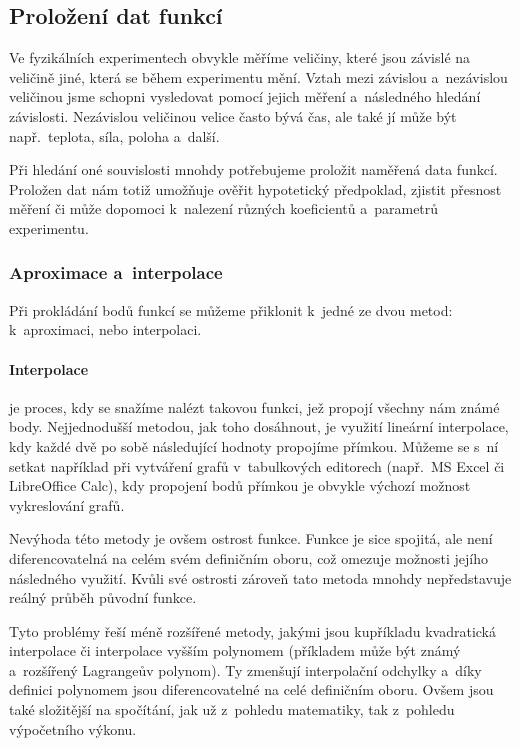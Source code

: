 \newcommand{\nsum}{\sum^n_{i=1}}
\newcommand{\nsumx}{\sum^n_{i=1}x_i}
\newcommand{\nsumy}{\sum^n_{i=1}y_i}
\newcommand{\nsumxx}{\sum^n_{i=1}x_i^2}
\newcommand{\nsumxy}{\sum^n_{i=1}x_iy_i}

\subsection{Proložení dat funkcí}
Ve fyzikálních experimentech obvykle měříme veličiny, které jsou závislé na
veličině jiné, která se během experimentu mění. Vztah mezi závislou
a~nezávislou veličinou jsme schopni vysledovat pomocí jejich měření a~následného
hledání závislosti.  Nezávislou veličinou velice často bývá čas, ale také jí
může být např.~teplota, síla, poloha a~další.~\cite{praktikum}
 
Při hledání oné souvislosti mnohdy potřebujeme proložit naměřená data funkcí.
Proložen dat nám totiž umožňuje ověřit hypotetický předpoklad, zjistit přesnost
měření či může dopomoci k~nalezení různých koeficientů a~parametrů experimentu.

\subsubsection{Aproximace a~interpolace}
Při prokládání bodů funkcí se můžeme přiklonit k~jedné ze dvou metod:
k~aproximaci, nebo interpolaci.

\paragraph{Interpolace} je proces, kdy se snažíme nalézt takovou funkci, jež
propojí všechny nám známé body. Nejjednodušší metodou, jak toho dosáhnout, je
využití lineární interpolace, kdy každé dvě po sobě následující hodnoty
propojíme přímkou. Můžeme se s~ní setkat například při vytváření grafů
v~tabulkových editorech (např.~MS Excel či LibreOffice Calc), kdy propojení
bodů přímkou je obvykle výchozí možnost vykreslování grafů. 

Nevýhoda této metody je ovšem ostrost funkce. Funkce je sice spojitá, ale není
diferencovatelná na celém svém definičním oboru, což omezuje možnosti jejího
následného využití. Kvůli své ostrosti zároveň tato metoda mnohdy nepředstavuje
reálný průběh původní funkce.~\cite{segeth}

Tyto problémy řeší méně rozšířené metody, jakými jsou kupříkladu kvadratická
interpolace či interpolace vyšším polynomem (příkladem může být známý
a~rozšířený Lagrangeův polynom). Ty zmenšují interpolační odchylky a~díky
definici polynomem jsou diferencovatelné na celé definičním oboru. Ovšem jsou
také složitější na spočítání, jak už z~pohledu matematiky, tak z~pohledu
výpočetního výkonu.

